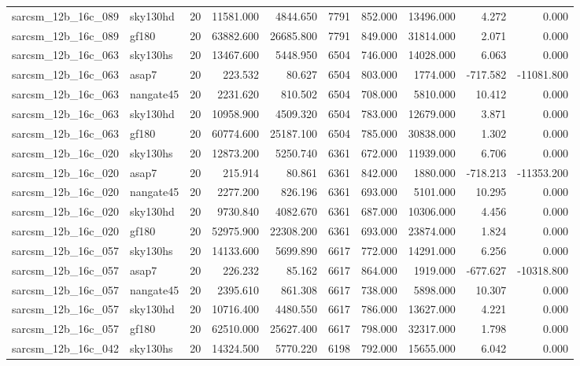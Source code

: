 \begin{tabular}{llrrrrrrrr}
sarcsm\_12b\_16c\_089 & sky130hd & 20 & 11581.000 & 4844.650 & 7791 & 852.000 & 13496.000 & 4.272 & 0.000 \\
sarcsm\_12b\_16c\_089 & gf180 & 20 & 63882.600 & 26685.800 & 7791 & 849.000 & 31814.000 & 2.071 & 0.000 \\
sarcsm\_12b\_16c\_063 & sky130hs & 20 & 13467.600 & 5448.950 & 6504 & 746.000 & 14028.000 & 6.063 & 0.000 \\
sarcsm\_12b\_16c\_063 & asap7 & 20 & 223.532 & 80.627 & 6504 & 803.000 & 1774.000 & -717.582 & -11081.800 \\
sarcsm\_12b\_16c\_063 & nangate45 & 20 & 2231.620 & 810.502 & 6504 & 708.000 & 5810.000 & 10.412 & 0.000 \\
sarcsm\_12b\_16c\_063 & sky130hd & 20 & 10958.900 & 4509.320 & 6504 & 783.000 & 12679.000 & 3.871 & 0.000 \\
sarcsm\_12b\_16c\_063 & gf180 & 20 & 60774.600 & 25187.100 & 6504 & 785.000 & 30838.000 & 1.302 & 0.000 \\
sarcsm\_12b\_16c\_020 & sky130hs & 20 & 12873.200 & 5250.740 & 6361 & 672.000 & 11939.000 & 6.706 & 0.000 \\
sarcsm\_12b\_16c\_020 & asap7 & 20 & 215.914 & 80.861 & 6361 & 842.000 & 1880.000 & -718.213 & -11353.200 \\
sarcsm\_12b\_16c\_020 & nangate45 & 20 & 2277.200 & 826.196 & 6361 & 693.000 & 5101.000 & 10.295 & 0.000 \\
sarcsm\_12b\_16c\_020 & sky130hd & 20 & 9730.840 & 4082.670 & 6361 & 687.000 & 10306.000 & 4.456 & 0.000 \\
sarcsm\_12b\_16c\_020 & gf180 & 20 & 52975.900 & 22308.200 & 6361 & 693.000 & 23874.000 & 1.824 & 0.000 \\
sarcsm\_12b\_16c\_057 & sky130hs & 20 & 14133.600 & 5699.890 & 6617 & 772.000 & 14291.000 & 6.256 & 0.000 \\
sarcsm\_12b\_16c\_057 & asap7 & 20 & 226.232 & 85.162 & 6617 & 864.000 & 1919.000 & -677.627 & -10318.800 \\
sarcsm\_12b\_16c\_057 & nangate45 & 20 & 2395.610 & 861.308 & 6617 & 738.000 & 5898.000 & 10.307 & 0.000 \\
sarcsm\_12b\_16c\_057 & sky130hd & 20 & 10716.400 & 4480.550 & 6617 & 786.000 & 13627.000 & 4.221 & 0.000 \\
sarcsm\_12b\_16c\_057 & gf180 & 20 & 62510.000 & 25627.400 & 6617 & 798.000 & 32317.000 & 1.798 & 0.000 \\
sarcsm\_12b\_16c\_042 & sky130hs & 20 & 14324.500 & 5770.220 & 6198 & 792.000 & 15655.000 & 6.042 & 0.000 \\

\end{tabular}
